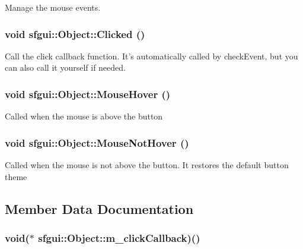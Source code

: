 Manage the mouse events. \hypertarget{classsfgui_1_1Object_da7f84701d318ce93fe59cc2f571eaf2}{
\subsubsection[Clicked]{\setlength{\rightskip}{0pt plus 5cm}void sfgui::Object::Clicked ()}}
\label{classsfgui_1_1Object_da7f84701d318ce93fe59cc2f571eaf2}




Call the click callback function. It's automatically called by checkEvent, but you can also call it yourself if needed. \hypertarget{classsfgui_1_1Object_68d1941ad05b3d0bdf2ba85702c04cc0}{
\subsubsection[MouseHover]{\setlength{\rightskip}{0pt plus 5cm}void sfgui::Object::MouseHover ()}}
\label{classsfgui_1_1Object_68d1941ad05b3d0bdf2ba85702c04cc0}




Called when the mouse is above the button \hypertarget{classsfgui_1_1Object_24575661efb4ab88be76eb2e1a4947e6}{
\subsubsection[MouseNotHover]{\setlength{\rightskip}{0pt plus 5cm}void sfgui::Object::MouseNotHover ()}}
\label{classsfgui_1_1Object_24575661efb4ab88be76eb2e1a4947e6}




Called when the mouse is not above the button. It restores the default button theme 

\subsection{Member Data Documentation}
\hypertarget{classsfgui_1_1Object_5917de9750aa3c8d282899ee83f835b4}{
\subsubsection[m\_\-clickCallback]{\setlength{\rightskip}{0pt plus 5cm}void($\ast$ {\bf sfgui::Object::m\_\-clickCallback})()}}
\label{classsfgui_1_1Object_5917de9750aa3c8d282899ee83f835b4}


